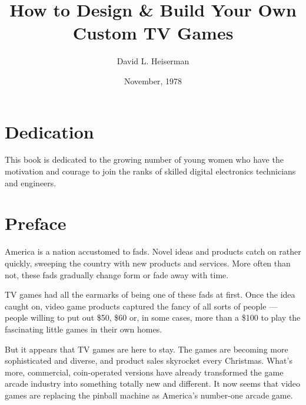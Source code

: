 \documentclass[11pt]{book}              %
\title{\bf How to Design \& Build Your Own Custom TV Games}
\author{David L. Heiserman}
\date{November, 1978}
\begin{document}
\frontmatter
\maketitle

\section{Dedication}
This book is dedicated to the growing number of young women who have the motivation and courage to join the ranks of skilled digital electronics technicians and engineers.

\newpage
%
%
%
%
%
%
%
%
%
%
%
%
%
%

\section{Preface}

America is a nation accustomed to fads. Novel ideas and products catch on rather quickly, sweeping the country with new products and
services. More often than not, these fads gradually change form or
fade away with time.

TV games had all the earmarks of being one of these fads at
first. Once the idea caught on, video game products captured the fancy of all sorts of people — people willing to put out \$50, \$60 or, in some cases, more than a \$100 to play the fascinating little games in their own homes.

But it appears that TV games are here to stay. The games are becoming more sophisticated and diverse, and product sales skyrocket every Christmas. What’s more, commercial, coin-operated versions have already transformed the game arcade industry into something totally new and different. It now seems that video games are replacing the pinball machine as America’s number-one arcade game.
\end{document}
